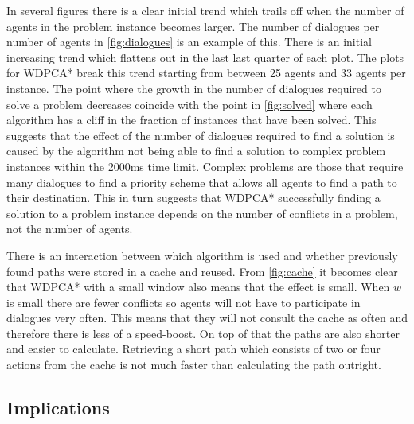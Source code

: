 In several figures there is a clear initial trend which trails off when the
number of agents in the problem instance becomes larger. The number of
dialogues per number of agents in \autoref{fig:dialogues} is an example of
this. There is an initial increasing trend which flattens out in the last last
quarter of each plot. The plots for WDPCA* break this trend starting
from between 25 agents and 33 agents per instance. The point where the growth
in the number of dialogues required to solve a problem decreases coincide with
the point in \autoref{fig:solved} where each algorithm has a cliff in the
fraction of instances that have been solved. This suggests that the effect of
the number of dialogues required to find a solution is caused by the algorithm
not being able to find a
solution to complex problem instances within the 2000ms time limit. Complex
problems are those that require many dialogues to find a priority scheme that
allows all agents to find a path to their destination. This in turn suggests
that WDPCA* successfully finding a solution to a problem instance depends on the
number of conflicts in a problem, not the number of agents.

There is an interaction between which algorithm is used and whether previously
found paths were stored in a cache and reused. From \autoref{fig:cache} it
becomes clear that WDPCA* with a small window also means that the effect is
small. When $w$ is small there are fewer conflicts so agents will not have
to participate in dialogues very often. This means that they will not consult
the cache as often and therefore there is less of a speed-boost. On top of that
the paths are also shorter and easier to calculate. Retrieving a short path
which consists of two or four actions from the cache is not much faster than 
calculating the path outright.

\subsection{Implications}

